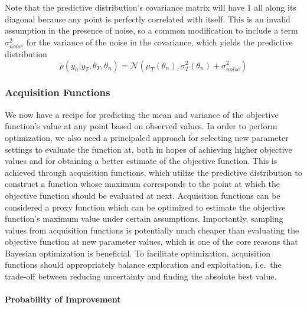 Note that the predictive distribution's covariance matrix will have 1 all along its diagonal because any point is perfectly correlated with itself.
This is an invalid assumption in the presence of noise, so a common modification to include a term $\sigma_{noise}^2$ for the variance of the noise in the covariance, which yields the predictive distribution
\begin{equation}
p(y_{n} | y_T, \theta_T, \theta_n) = \mathcal{N}(\mu_T(\theta_n), \sigma_T^2(\theta_n) + \sigma_{noise}^2)
\end{equation}

\subsubsection{Acquisition Functions}

We now have a recipe for predicting the mean and variance of the objective function's value at any point based on observed values.
In order to perform optimization, we also need a principaled approach for selecting new parameter settings to evaluate the function at, both in hopes of achieving higher objective values and for obtaining a better estimate of the objective function.
This is achieved through acquisition functions, which utilize the predictive distribution to construct a function whose maximum corresponds to the point at which the objective function should be evaluated at next.
Acquisition functions can be considered a proxy function which can be optimized to estimate the objective function's maximum value under certain assumptions.
Importantly, sampling values from acquisition functions is potentially much cheaper than evaluating the objective function at new parameter values, which is one of the core reasons that Bayesian optimization is beneficial.
To facilitate optimization, acquisition functions should appropriately balance exploration and exploitation, i.e.\ the trade-off between reducing uncertainty and finding the absolute best value.

\paragraph{Probability of Improvement}

